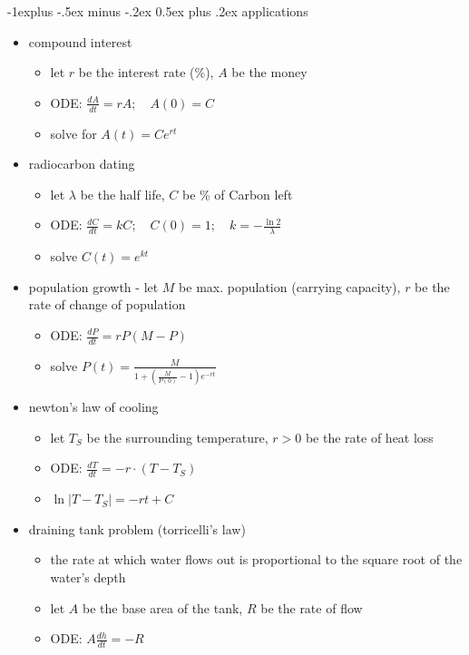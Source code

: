 \documentclass[10pt, landscape]{article}
\makeatletter
\renewcommand{\subsection}{\@startsection{subsection}{2}{0mm}%
                                {-1explus -.5ex minus -.2ex}%
                                {0.5ex plus .2ex}%
                                {\normalfont\normalsize\bfseries}}
\newcommand{\abs}[1]{\vert #1 \vert}
\makeatother
\begin{document}
\begin{multicols}{4}
\subsection{applications}
\begin{itemize}
    \item compound interest
    \begin{itemize}
        \item let $r$ be the interest rate (\%), $A$ be the money
        \item ODE: $\frac{dA}{dt} = rA; \quad A(0) = C$
        \item solve for $A(t) = Ce^{rt}$
    \end{itemize}
    \item radiocarbon dating 
    \begin{itemize}
        \item let $\lambda$ be the half life, $C$ be \% of Carbon left
        \item ODE: $\frac{dC}{dt} = kC; \quad C(0) = 1; \quad k = -\frac{\ln 2}{\lambda}$
        \item solve $C(t) = e^{kt}$
    \end{itemize}
    \item population growth - let $M$ be max. population (carrying capacity), $r$ be the rate of change of population
    \begin{itemize}
        \item ODE: $\frac{dP}{dt} = rP(M-P)$
        \item solve $P(t) = \frac{M}{1 + (\frac{M}{P(0)} - 1)e^{-rt}}$
    \end{itemize}
    \item newton's law of cooling
    \begin{itemize}
        \item let $T_S$ be the surrounding temperature, $r > 0$ be the rate of heat loss
        \item ODE: $\frac{dT}{dt} = -r \cdot (T - T_S)$
        \item $\ln \abs{T - T_S} = -rt + C$
    \end{itemize}
    \item draining tank problem (torricelli's law)
    \begin{itemize}
        \item the rate at which water flows out is proportional to the square root of the water's depth
        \item let $A$ be the base area of the tank, $R$ be the rate of flow
        \item ODE: $A \frac{dh}{dt} = -R$
    \end{itemize}
\end{itemize}




\end{multicols}
\end{document}
